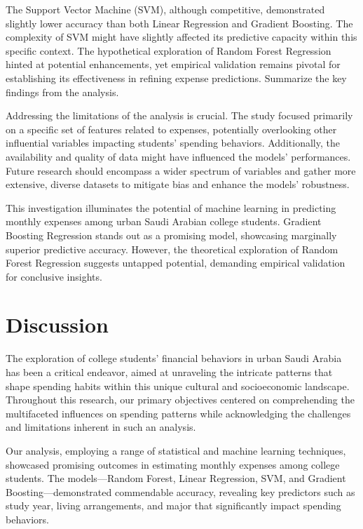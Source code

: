 \documentclass[
]{article}
\begin{document}
The Support Vector Machine (SVM), although competitive, demonstrated
slightly lower accuracy than both Linear Regression and Gradient
Boosting. The complexity of SVM might have slightly affected its
predictive capacity within this specific context. The hypothetical
exploration of Random Forest Regression hinted at potential
enhancements, yet empirical validation remains pivotal for establishing
its effectiveness in refining expense predictions. Summarize the key
findings from the analysis.

Addressing the limitations of the analysis is crucial. The study focused
primarily on a specific set of features related to expenses, potentially
overlooking other influential variables impacting students' spending
behaviors. Additionally, the availability and quality of data might have
influenced the models' performances. Future research should encompass a
wider spectrum of variables and gather more extensive, diverse datasets
to mitigate bias and enhance the models' robustness.

This investigation illuminates the potential of machine learning in
predicting monthly expenses among urban Saudi Arabian college students.
Gradient Boosting Regression stands out as a promising model, showcasing
marginally superior predictive accuracy. However, the theoretical
exploration of Random Forest Regression suggests untapped potential,
demanding empirical validation for conclusive insights.

\hypertarget{discussion}{%
\section{Discussion}\label{discussion}}

The exploration of college students' financial behaviors in urban Saudi
Arabia has been a critical endeavor, aimed at unraveling the intricate
patterns that shape spending habits within this unique cultural and
socioeconomic landscape. Throughout this research, our primary
objectives centered on comprehending the multifaceted influences on
spending patterns while acknowledging the challenges and limitations
inherent in such an analysis.

Our analysis, employing a range of statistical and machine learning
techniques, showcased promising outcomes in estimating monthly expenses
among college students. The models---Random Forest, Linear Regression,
SVM, and Gradient Boosting---demonstrated commendable accuracy,
revealing key predictors such as study year, living arrangements, and
major that significantly impact spending behaviors.
\end{document}
